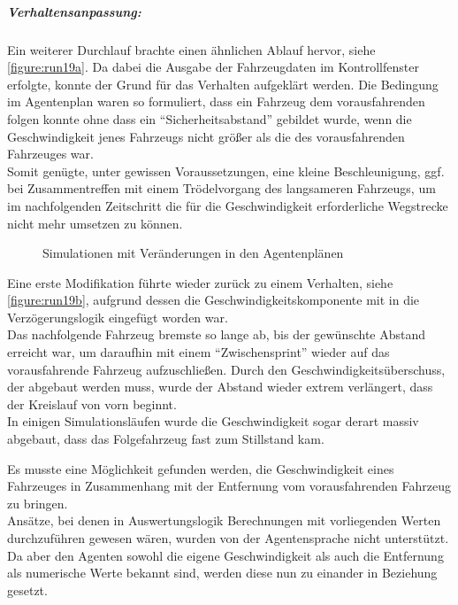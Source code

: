 \subparagraph*{Verhaltensanpassung:}
Ein weiterer Durchlauf brachte einen ähnlichen Ablauf hervor, siehe \cref{figure:run19a}.
Da dabei die Ausgabe der Fahrzeugdaten im Kontrollfenster erfolgte, konnte der Grund für das Verhalten aufgeklärt werden.
Die Bedingung im Agentenplan waren so formuliert, dass ein Fahrzeug dem vorausfahrenden folgen konnte ohne dass ein \enquote{Sicherheitsabstand} gebildet wurde, wenn die Geschwindigkeit jenes Fahrzeugs nicht größer als die des vorausfahrenden Fahrzeuges war. 
\\
Somit genügte, unter gewissen Voraussetzungen, eine kleine Beschleunigung, ggf. bei Zusammentreffen mit einem Trödelvorgang des langsameren Fahrzeugs, um im nachfolgenden Zeitschritt die für die Geschwindigkeit erforderliche Wegstrecke nicht mehr umsetzen zu können.

\begin{figure}[hptb]
  \centering 
   \qquad 
   \qquad 
  \caption{Simulationen mit Veränderungen in den Agentenplänen} 
  \label{figure:run19a-c}
\end{figure}

Eine erste Modifikation führte wieder zurück zu einem Verhalten, siehe \cref{figure:run19b}, aufgrund dessen die Geschwindigkeitskomponente mit in die Verzögerungslogik eingefügt worden war. 
\\
Das nachfolgende Fahrzeug bremste so lange ab, bis der gewünschte Abstand erreicht war, um daraufhin mit einem \enquote{Zwischensprint} wieder auf das vorausfahrende Fahrzeug aufzuschließen.
Durch den Geschwindigkeitsüberschuss, der abgebaut werden muss, wurde der Abstand wieder extrem verlängert, dass der Kreislauf von vorn beginnt.
\\
In einigen Simulationsläufen wurde die Geschwindigkeit sogar derart massiv abgebaut, dass das Folgefahrzeug fast zum Stillstand kam.

Es musste eine Möglichkeit gefunden werden, die Geschwindigkeit eines Fahrzeuges in Zusammenhang mit der Entfernung vom vorausfahrenden Fahrzeug zu bringen.
\\
Ansätze, bei denen in Auswertungslogik Berechnungen mit vorliegenden Werten durchzuführen gewesen wären, wurden von der Agentensprache nicht unterstützt.
\\
Da aber den Agenten sowohl die eigene Geschwindigkeit als auch die Entfernung als numerische Werte bekannt sind, werden diese nun zu einander in Beziehung gesetzt.

